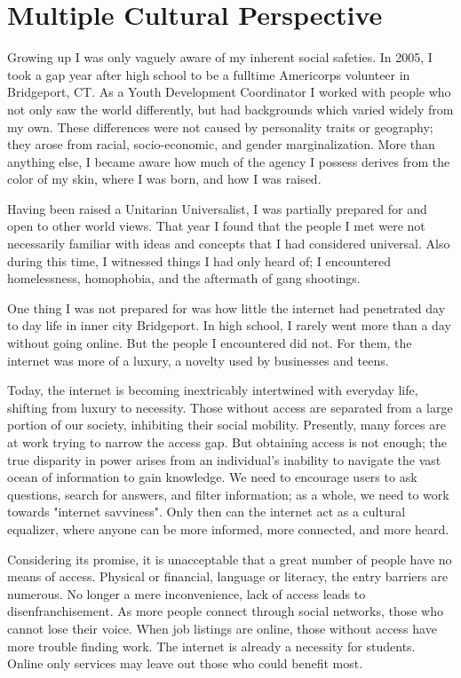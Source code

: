 \chapter{Multiple Cultural Perspective}

Growing up I was only vaguely aware of my inherent social safeties. In
2005, I took a gap year after high school to be a fulltime Americorps
volunteer in Bridgeport, CT. As a Youth Development Coordinator I worked
with people who not only saw the world differently, but had backgrounds
which varied widely from my own. These differences were not caused by
personality traits or geography; they arose from racial, socio-economic,
and gender marginalization. More than anything else, I became aware how
much of the agency I possess derives from the color of my skin, where I
was born, and how I was raised.

Having been raised a Unitarian Universalist, I was partially prepared
for and open to other world views. That year I found that the people I
met were not necessarily familiar with ideas and concepts that I had
considered universal. Also during this time, I witnessed things I had
only heard of; I encountered homelessness, homophobia, and the aftermath
of gang shootings.

One thing I was not prepared for was how little the internet had
penetrated day to day life in inner city Bridgeport. In high school,
I rarely went more than a day without going online. But the people I
encountered did not. For them, the internet was more of a luxury, a
novelty used by businesses and teens.


Today, the internet is becoming inextricably intertwined with everyday
life, shifting from luxury to necessity. Those without access are
separated from a large portion of our society, inhibiting their social
mobility. Presently, many forces are at work trying to narrow the access
gap. But obtaining access is not enough; the true disparity in power
arises from an individual's inability to navigate the vast ocean of
information to gain knowledge. We need to encourage users to ask questions,
search for answers, and filter information; as a whole, we need to work
towards "internet savviness". Only then can the internet act as a cultural
equalizer, where anyone can be more informed, more connected, and more
heard.


Considering its promise, it is unacceptable that a great number of
people have no means of access. Physical or financial, language
or literacy, the entry barriers are numerous. No longer a mere
inconvenience, lack of access leads to disenfranchisement. As more
people connect through social networks, those who cannot lose their
voice. When job listings are online, those without access have more
trouble finding work. The internet is already a necessity for students.
Online only services may leave out those who could benefit most.

